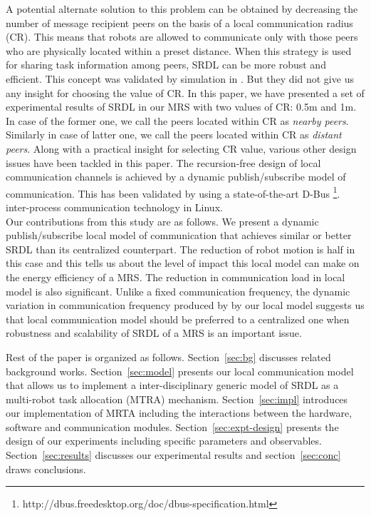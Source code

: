 \documentclass[letterpaper, 10 pt, conference]{ieeeconf}  %
\begin{document}
A potential alternate solution to this problem can be obtained by decreasing the number of message recipient peers on the basis of a local communication radius (CR). This means that robots are allowed to communicate only with those peers who are physically located within a preset distance. When this strategy is used for sharing task information among peers, SRDL can be more robust and efficient. This concept was validated by simulation in \cite{Agassounon}. But they did not give us any insight for choosing the value of CR. In this paper, we have presented a set of experimental results of SRDL in our MRS with two values of CR: 0.5m and 1m. In case of the former one, we call the peers located within CR as {\em nearby peers}. Similarly in case of latter one, we call the peers located within CR as {\em distant peers}. Along with a practical insight for selecting CR value, various other design issues have been tackled in this paper. The recursion-free design of  local communication channels is achieved by a dynamic publish/subscribe model of communication. This has been validated by using a state-of-the-art D-Bus \footnote{http://dbus.freedesktop.org/doc/dbus-specification.html}. inter-process communication technology in Linux.\\
Our contributions from this study are as follows. We present a dynamic publish/subscribe local model of communication that achieves similar or better SRDL than its centralized counterpart. The reduction of robot motion is half in this case and this tells us about the level of impact this local model can make on the energy efficiency of a MRS. The reduction in communication load in local model  is also significant.  Unlike a fixed communication frequency, the dynamic variation in communication frequency produced by by our local model suggests us that local communication model should be preferred to a centralized one when robustness and scalability of SRDL of a MRS is an important issue.

Rest of the paper is organized as follows. Section~\ref{sec:bg} discusses related background works. Section~\ref{sec:model} presents our local communication model that allows us to implement a inter-disciplinary generic model of SRDL as a multi-robot task allocation (MTRA) mechanism. Section~\ref{sec:impl} introduces our implementation of MRTA including the interactions between the hardware, software and communication modules. Section~\ref{sec:expt-design} presents the design of our experiments including specific parameters and observables. Section~\ref{sec:results} discusses our experimental results and section~\ref{sec:conc} draws conclusions.
%
\end{document}
